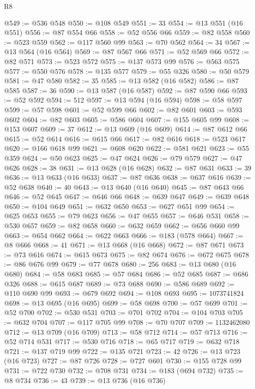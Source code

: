 \begin{lexlean}{R8}
\begin{coremodule}
@549 := @536 @548
@550 := @108 @549
@551 := 33
@554 := @13 @551 (@16 @551)
@556 := @87 @554 @66
@558 := @52 @556 @66
@559 := @82 @558
@560 := @523 @559
@562 := @117 @560 @99
@563 := @70 @562
@564 := 34
@567 := @13 @564 (@16 @564)
@569 := @87 @567 @66
@571 := @52 @569 @66
@572 := @82 @571
@573 := @523 @572
@575 := @137 @573 @99
@576 := @563 @575
@577 := @550 @576
@578 := @135 @577
@579 := @55 @326
@580 := @50 @579
@581 := @47 @580
@582 := 35
@585 := @13 @582 (@16 @582)
@586 := @87 @585
@587 := 36
@590 := @13 @587 (@16 @587)
@592 := @87 @590 @66
@593 := @52 @592
@594 := 512
@597 := @13 @594 (@16 @594)
@598 := @58 @597
@599 := @57 @598
@601 := @52 @599 @66
@602 := @82 @601
@603 := @593 @602
@604 := @82 @603
@605 := @586 @604
@607 := @155 @605 @99
@608 := @153 @607
@609 := 37
@612 := @13 @609 (@16 @609)
@614 := @87 @612 @66
@615 := @52 @614
@616 := @615 @66
@617 := @82 @616
@618 := @523 @617
@620 := @166 @618 @99
@621 := @608 @620
@622 := @581 @621
@623 := @55 @359
@624 := @50 @623
@625 := @47 @624
@626 := @79 @579
@627 := @47 @626
@628 := 38
@631 := @13 @628 (@16 @628)
@632 := @87 @631
@633 := 39
@636 := @13 @633 (@16 @633)
@637 := @87 @636
@638 := @637 @616
@639 := @52 @638
@640 := 40
@643 := @13 @640 (@16 @640)
@645 := @87 @643 @66
@646 := @52 @645
@647 := @646 @66
@648 := @639 @647
@649 := @639 @648
@650 := @104 @649
@651 := @632 @650
@653 := @627 @651 @99
@654 := @625 @653
@655 := @79 @623
@656 := @47 @655
@657 := @646 @531
@658 := @530 @657
@659 := @82 @658
@660 := @632 @659
@662 := @656 @660 @99
@663 := @654 @662
@664 := @622 @663
@666 := @183 (@578 @664)
@667 := @8 @666
@668 := 41
@671 := @13 @668 (@16 @668)
@672 := @87 @671
@673 := @73 @616
@674 := @615 @673
@675 := @82 @674
@676 := @672 @675
@678 := @86 @676 @99
@679 := @77 @678
@680 := 256
@683 := @13 @680 (@16 @680)
@684 := @58 @683
@685 := @57 @684
@686 := @52 @685
@687 := @686 @326
@688 := @615 @687
@689 := @73 @688
@690 := @586 @689
@692 := @110 @690 @99
@693 := @679 @692
@694 := @108 @693
@695 := 1073741824
@698 := @13 @695 (@16 @695)
@699 := @58 @698
@700 := @57 @699
@701 := @52 @700
@702 := @530 @531
@703 := @701 @702
@704 := @104 @703
@705 := @632 @704
@707 := @117 @705 @99
@708 := @70 @707
@709 := 1132462080
@712 := @13 @709 (@16 @709)
@713 := @58 @712
@714 := @57 @713
@716 := @52 @714 @531
@717 := @530 @716
@718 := @65 @717
@719 := @632 @718
@721 := @137 @719 @99
@722 := @135 @721
@723 := 42
@726 := @13 @723 (@16 @723)
@727 := @87 @726
@728 := @727 @601
@730 := @155 @728 @99
@731 := @722 @730
@732 := @708 @731
@734 := @183 (@694 @732)
@735 := @8 @734
@736 := 43
@739 := @13 @736 (@16 @736)

\end{coremodule}
\end{lexlean}
